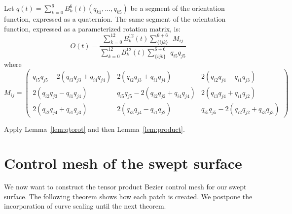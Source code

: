 \begin{lemma}
\label{lem:Mij}
Let $q(t) = \sum_{k=0}^6 B_k^6(t) (q_{k1},\ldots,q_{k5})$
be a segment of the orientation function, expressed as a quaternion.
The same segment of the orientation function, expressed as a parameterized
rotation matrix, is:
\begin{equation}
\label{eq:Ot}
O(t) = \frac{\sum_{k=0}^{12} B_k^{12}(t) \sum_{\{ijk\}}^{6+6}\ \ M_{ij}}
	    {\sum_{k=0}^{12} B_k^{12}(t) \sum_{\{ijk\}}^{6+6} \ \ q_{i5}q_{j5}}
\end{equation}
where
\[
	M_{ij} = \left( \begin{array}{ccc}
	q_{i5}q_{j5} - 2(q_{i3}q_{j3} + q_{i4}q_{j4}) &
	2(q_{i2}q_{j3} + q_{i1}q_{j4}) &
	2(q_{i2}q_{j4} - q_{i1}q_{j3}) \\
	2(q_{i2}q_{j3} - q_{i1}q_{j4}) &
	q_{i5}q_{j5} - 2(q_{i2}q_{j2} + q_{i4}q_{j4}) &
	2(q_{i3}q_{j4} + q_{i1}q_{j2}) \\
	2(q_{i2}q_{j4} + q_{i1}q_{j3}) &
	2(q_{i3}q_{j4} - q_{i1}q_{j2}) &
	q_{i5}q_{j5} - 2(q_{i2}q_{j2} + q_{i3}q_{j3}) 
	\end{array} \right)
\]
\end{lemma}
\prf
Apply Lemma~\ref{lem:qtorot} and then Lemma~\ref{lem:product}.
\QED

\section{Control mesh of the swept surface}
\label{sec:mesh}

We now want to construct the tensor product Bezier control mesh 
for our swept surface.
The following theorem shows how each patch is created.
We postpone the incorporation of curve scaling until the next theorem.

